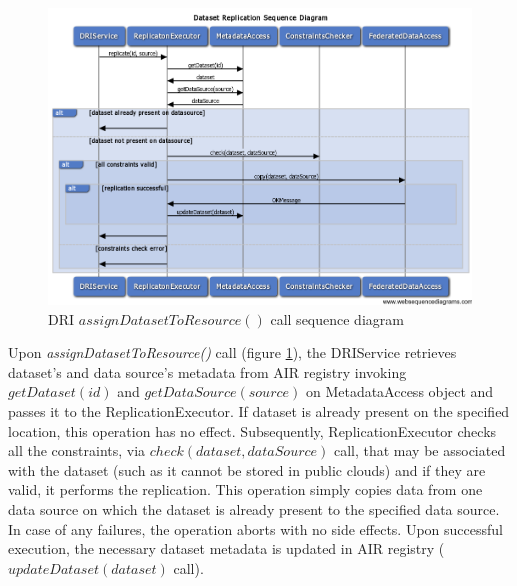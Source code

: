 \begin{figure}[h!]
	\centering
	\includegraphics[width=\textwidth]{images/replication-diagram.png}
	\caption{DRI $assignDatasetToResource()$ call sequence diagram}
	\label{fig:replication-diagram}
\end{figure}

Upon \textit{assignDatasetToResource()} 
call (figure \ref{fig:replication-diagram}), the DRIService retrieves
dataset's and data source's metadata from AIR registry invoking
$getDataset(id)$ and $getDataSource(source)$ on MetadataAccess object and
passes it to the ReplicationExecutor. If dataset is already present on the
specified location, this operation has no effect. Subsequently,
ReplicationExecutor checks all the constraints, via 
$check(dataset, dataSource)$ call, that may be associated with the
dataset (such as it cannot be stored in public clouds) and if they are valid,
it performs the replication. This operation simply copies data from one data
source on which the dataset is already present to the specified data source.
In case of any failures, the operation aborts with no side effects. Upon
successful execution, the necessary dataset metadata is updated in AIR registry
($updateDataset(dataset)$ call).\\

